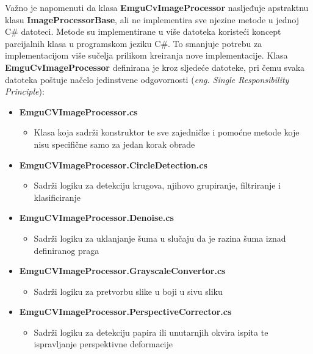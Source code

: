 \documentclass{foi}
\begin{document}
Važno je napomenuti da klasa \textbf{EmguCvImageProcessor} nasljeđuje apstraktnu klasu \textbf{ImageProcessorBase}, ali ne implementira sve njezine metode u jednoj C\# datoteci. Metode su implementirane u više datoteka koristeći koncept parcijalnih klasa u programskom jeziku C\#. To smanjuje potrebu za implementacijom više sučelja prilikom kreiranja nove implementacije. Klasa \textbf{EmguCvImageProcessor} definirana je kroz sljedeće datoteke, pri čemu svaka datoteka poštuje načelo jedinstvene odgovornosti (\textit{eng. Single Responsibility Principle}):

\begin{itemize}
    \item \textbf{EmguCVImageProcessor.cs}
    \begin{itemize}
        \item Klasa koja sadrži konstruktor te sve zajedničke i pomoćne metode koje nisu specifične samo za jedan korak obrade
    \end{itemize}
    
    \item \textbf{EmguCVImageProcessor.CircleDetection.cs}
    \begin{itemize}
        \item Sadrži logiku za detekciju krugova, njihovo grupiranje, filtriranje i klasificiranje
    \end{itemize}

    \item \textbf{EmguCVImageProcessor.Denoise.cs}
    \begin{itemize}
        \item Sadrži logiku za uklanjanje šuma u slučaju da je razina šuma iznad definiranog praga
    \end{itemize}

    \item \textbf{EmguCVImageProcessor.GrayscaleConvertor.cs}
    \begin{itemize}
        \item Sadrži logiku za pretvorbu slike u boji u sivu sliku
    \end{itemize}

    \item \textbf{EmguCVImageProcessor.PerspectiveCorrector.cs}
    \begin{itemize}
        \item Sadrži logiku za detekciju papira ili unutarnjih okvira ispita te ispravljanje perspektivne deformacije
    \end{itemize}


\end{itemize}
\end{document}
